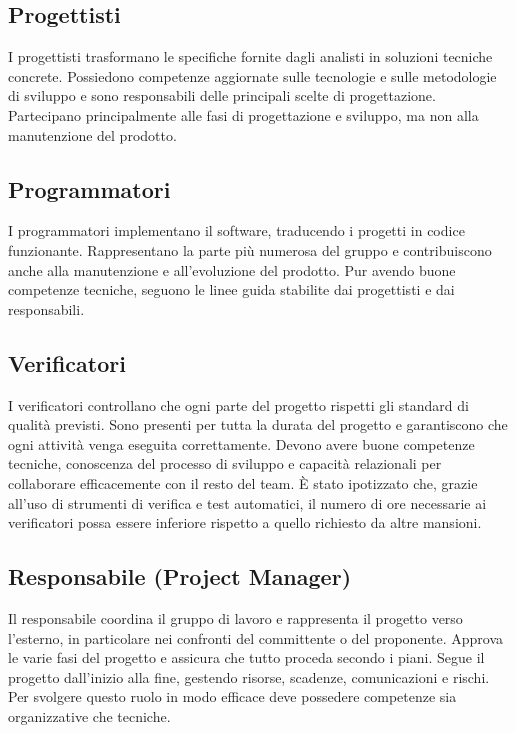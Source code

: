 \documentclass[a4paper, 11pt, oneside]{scrartcl} %
\begin{document}
\subsection{Progettisti}

I progettisti trasformano le specifiche fornite dagli analisti in soluzioni tecniche concrete.  
Possiedono competenze aggiornate sulle tecnologie e sulle metodologie di sviluppo e sono responsabili delle principali scelte di progettazione.  
Partecipano principalmente alle fasi di progettazione e sviluppo, ma non alla manutenzione del prodotto.

\subsection{Programmatori}

I programmatori implementano il software, traducendo i progetti in codice funzionante.  
Rappresentano la parte più numerosa del gruppo e contribuiscono anche alla manutenzione e all’evoluzione del prodotto.  
Pur avendo buone competenze tecniche, seguono le linee guida stabilite dai progettisti e dai responsabili.

\subsection{Verificatori}

I verificatori controllano che ogni parte del progetto rispetti gli standard di qualità previsti.  
Sono presenti per tutta la durata del progetto e garantiscono che ogni attività venga eseguita correttamente.  
Devono avere buone competenze tecniche, conoscenza del processo di sviluppo e capacità relazionali per collaborare efficacemente con il resto del team.
È stato ipotizzato che, grazie all’uso di strumenti di verifica e test automatici, il numero di ore necessarie ai verificatori possa essere inferiore rispetto a quello richiesto da altre mansioni.

\subsection{Responsabile (Project Manager)}

Il responsabile coordina il gruppo di lavoro e rappresenta il progetto verso l’esterno, in particolare nei confronti del committente o del proponente.  
Approva le varie fasi del progetto e assicura che tutto proceda secondo i piani.  
Segue il progetto dall’inizio alla fine, gestendo risorse, scadenze, comunicazioni e rischi.  
Per svolgere questo ruolo in modo efficace deve possedere competenze sia organizzative che tecniche.
\end{document}
